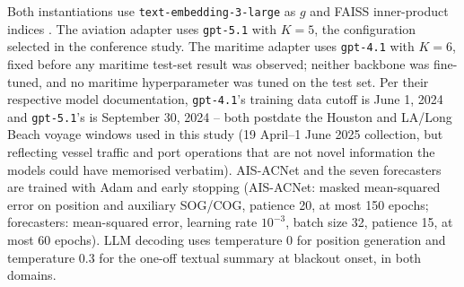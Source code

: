 Both instantiations use \texttt{text-embedding-3-large} as $g$ and FAISS
inner-product indices \citep{johnson2021billion}. The aviation adapter uses
\texttt{gpt-5.1} with $K=5$, the configuration selected in the conference
study. The maritime adapter uses \texttt{gpt-4.1} with $K=6$, fixed before
any maritime test-set result was observed; neither backbone was fine-tuned,
and no maritime hyperparameter was tuned on the test set. Per their
respective model documentation, \texttt{gpt-4.1}'s training data cutoff is
June 1, 2024 and \texttt{gpt-5.1}'s is September 30, 2024 -- both postdate
the Houston and LA/Long Beach voyage windows used in this study (19
April--1 June 2025 collection, but reflecting vessel traffic and port
operations that are not novel information the models could have memorised
verbatim). AIS-ACNet and the
seven forecasters are trained with Adam and early stopping (AIS-ACNet:
masked mean-squared error on position and auxiliary SOG/COG, patience 20, at
most 150 epochs; forecasters: mean-squared error, learning rate $10^{-3}$,
batch size 32, patience 15, at most 60 epochs). LLM decoding uses
temperature 0 for position generation and temperature 0.3 for the one-off
textual summary at blackout onset, in both domains.
